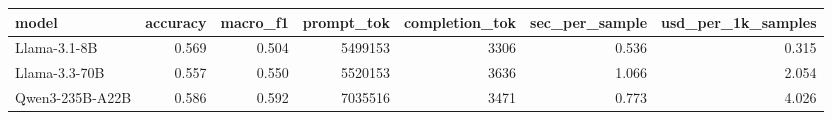 \begin{tabular}{lrrrrrr}
\toprule
model & accuracy & macro\_f1 & prompt\_tok & completion\_tok & sec\_per\_sample & usd\_per\_1k\_samples \\
\midrule
Llama-3.1-8B & 0.569 & 0.504 & 5499153 & 3306 & 0.536 & 0.315 \\
Llama-3.3-70B & 0.557 & 0.550 & 5520153 & 3636 & 1.066 & 2.054 \\
Qwen3-235B-A22B & 0.586 & 0.592 & 7035516 & 3471 & 0.773 & 4.026 \\
\bottomrule
\end{tabular}

